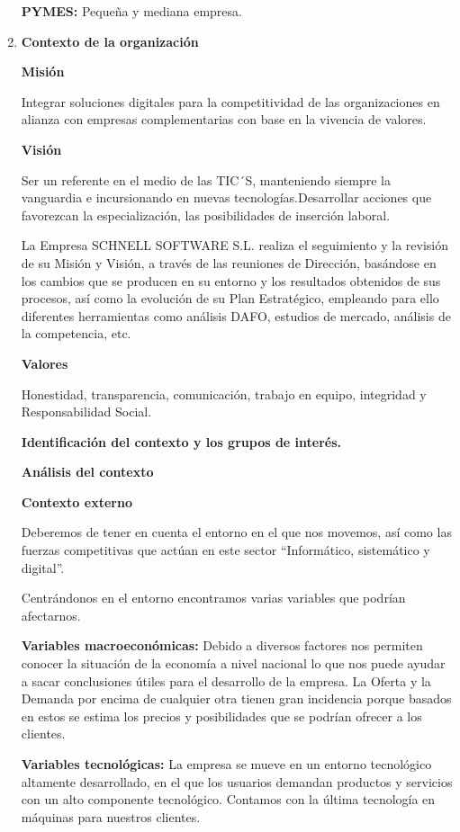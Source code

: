 \documentclass[10pt,a4paper]{article}
\begin{document}
\begin{enumerate}
\textbf{PYMES: }Pequeña y mediana empresa.

\item \textbf{Contexto de la organización}

\textbf{Misión}

Integrar soluciones digitales para la competitividad de las organizaciones en alianza con empresas complementarias con base en la vivencia de valores.

\textbf{Visión}

Ser un referente en el medio de las TIC´S, manteniendo siempre la vanguardia e incursionando en nuevas tecnologías.Desarrollar acciones que favorezcan la especialización, las posibilidades de inserción laboral.

La Empresa SCHNELL SOFTWARE S.L. realiza el seguimiento y la revisión de su Misión y Visión, a través de las reuniones de
Dirección, basándose en los cambios que se producen en su entorno y los resultados obtenidos de sus procesos, así como la evolución de su Plan Estratégico, empleando para ello diferentes herramientas como análisis DAFO, estudios de mercado, análisis de la competencia, etc.

\textbf{Valores}

Honestidad, transparencia, comunicación, trabajo en equipo, integridad y Responsabilidad Social.

\textbf{Identificación del contexto y los grupos de interés.}

\textbf{Análisis del contexto}

\textbf{Contexto externo}

Deberemos de tener en cuenta el entorno en el que nos movemos, así como las fuerzas competitivas que actúan en este sector “Informático, sistemático y digital”.

Centrándonos en el entorno encontramos varias variables que podrían afectarnos.

\textbf{Variables macroeconómicas: }Debido a diversos factores nos permiten conocer la situación de la economía a nivel nacional lo que nos puede ayudar a sacar conclusiones útiles para el desarrollo de la empresa. La Oferta y la Demanda por encima de cualquier otra tienen gran incidencia porque basados en estos se estima los precios y posibilidades que se podrían ofrecer a los clientes.

\textbf{Variables tecnológicas: }La empresa se mueve en un entorno tecnológico altamente desarrollado, en el que los usuarios demandan productos y servicios con un alto componente tecnológico. Contamos con la última tecnología en máquinas para nuestros clientes.


\end{enumerate}
\end{document}
